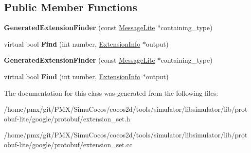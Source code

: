\subsection*{Public Member Functions}
\begin{DoxyCompactItemize}
\item 
\mbox{\label{classgoogle_1_1protobuf_1_1internal_1_1GeneratedExtensionFinder_ad6239db8d12c4dd0385d7a073fc030b0}} 
{\bfseries Generated\+Extension\+Finder} (const \hyperlink{classgoogle_1_1protobuf_1_1MessageLite}{Message\+Lite} $\ast$containing\+\_\+type)
\item 
\mbox{\label{classgoogle_1_1protobuf_1_1internal_1_1GeneratedExtensionFinder_a888d229a2d25162dd8285d508cf702b1}} 
virtual bool {\bfseries Find} (int number, \hyperlink{structgoogle_1_1protobuf_1_1internal_1_1ExtensionInfo}{Extension\+Info} $\ast$output)
\item 
\mbox{\label{classgoogle_1_1protobuf_1_1internal_1_1GeneratedExtensionFinder_ad6239db8d12c4dd0385d7a073fc030b0}} 
{\bfseries Generated\+Extension\+Finder} (const \hyperlink{classgoogle_1_1protobuf_1_1MessageLite}{Message\+Lite} $\ast$containing\+\_\+type)
\item 
\mbox{\label{classgoogle_1_1protobuf_1_1internal_1_1GeneratedExtensionFinder_a35619b3e7fa6c57a98acc493193c0107}} 
virtual bool {\bfseries Find} (int number, \hyperlink{structgoogle_1_1protobuf_1_1internal_1_1ExtensionInfo}{Extension\+Info} $\ast$output)
\end{DoxyCompactItemize}


The documentation for this class was generated from the following files\+:\begin{DoxyCompactItemize}
\item 
/home/pmx/git/\+P\+M\+X/\+Simu\+Cocos/cocos2d/tools/simulator/libsimulator/lib/protobuf-\/lite/google/protobuf/extension\+\_\+set.\+h\item 
/home/pmx/git/\+P\+M\+X/\+Simu\+Cocos/cocos2d/tools/simulator/libsimulator/lib/protobuf-\/lite/google/protobuf/extension\+\_\+set.\+cc\end{DoxyCompactItemize}

